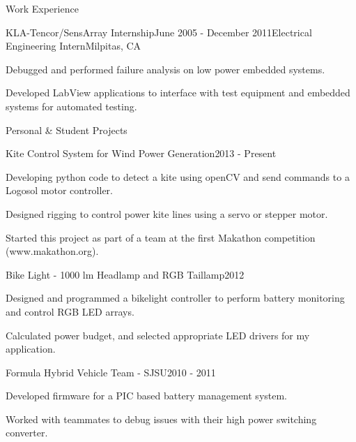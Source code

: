 \documentclass{resume} %
\begin{document}
\begin{rSection}{Work Experience}
\pagebreak[2]
\ssquish
\begin{rSubsection}{KLA-Tencor/SensArray Internship}{June 2005 - December 2011}{Electrical Engineering Intern}{Milpitas, CA}
\item Debugged and performed failure analysis on low power embedded systems. 
\item Developed LabView applications to interface with test equipment and embedded systems for automated testing.
\end{rSubsection}
\end{rSection}

\pagebreak[3]
\begin{rSection}{Personal \& Student Projects}

\ssquish
\begin{rProject}{Kite Control System for Wind Power Generation}{2013 - Present}
\item Developing python code to detect a kite using openCV and send commands to a Logosol motor controller.
\item Designed rigging to control power kite lines using a servo or stepper motor.
\item Started this project as part of a team at the first Makathon competition (www.makathon.org).
\end{rProject}

\ssquish
\begin{rProject}{Bike Light - 1000 lm Headlamp and RGB Taillamp}{2012}
\item Designed and programmed a bikelight controller to perform battery monitoring and control RGB LED arrays.
\item Calculated power budget, and selected appropriate LED drivers for my application.
\end{rProject}

\ssquish
\begin{rProject}{Formula Hybrid Vehicle Team - SJSU}{2010 - 2011}
\item Developed firmware for a PIC based battery management system.
\item Worked with teammates to debug issues with their high power switching converter.
\end{rProject}
\end{rSection}
\end{document}
